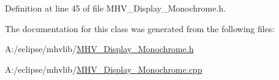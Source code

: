 \-Definition at line 45 of file \-M\-H\-V\-\_\-\-Display\-\_\-\-Monochrome.\-h.



\-The documentation for this class was generated from the following files\-:\begin{DoxyCompactItemize}
\item 
\-A\-:/eclipse/mhvlib/\hyperlink{_m_h_v___display___monochrome_8h}{\-M\-H\-V\-\_\-\-Display\-\_\-\-Monochrome.\-h}\item 
\-A\-:/eclipse/mhvlib/\hyperlink{_m_h_v___display___monochrome_8cpp}{\-M\-H\-V\-\_\-\-Display\-\_\-\-Monochrome.\-cpp}\end{DoxyCompactItemize}
